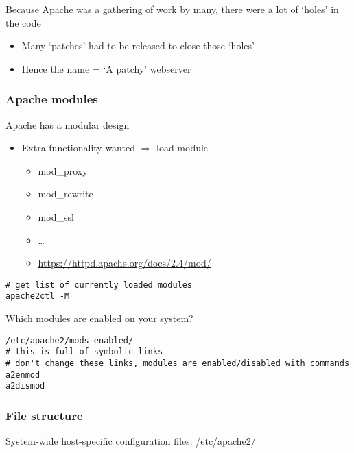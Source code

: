 \documentclass{article}
\begin{document}
Because Apache was a gathering of work by many, there were a lot of `holes' in the code

\begin{itemize}
    \item Many `patches' had to be released to close those `holes'
    \item Hence the name = `A patchy' webserver
\end{itemize}

\subsubsection{Apache modules}

Apache has a modular design

\begin{itemize}
    \item Extra functionality wanted $\Rightarrow$ load module
    \begin{itemize}
        \item mod\_proxy
        \item mod\_rewrite
        \item mod\_ssl
        \item \dots
        \item \url{https://httpd.apache.org/docs/2.4/mod/}
    \end{itemize}
\end{itemize}

\begin{verbatim}
# get list of currently loaded modules
apache2ctl -M
\end{verbatim}

Which modules are enabled on your system?

\begin{verbatim}
/etc/apache2/mods-enabled/
# this is full of symbolic links
# don't change these links, modules are enabled/disabled with commands
a2enmod
a2dismod
\end{verbatim}

\subsubsection{File structure}

System-wide host-specific configuration files: /etc/apache2/
\end{document}
